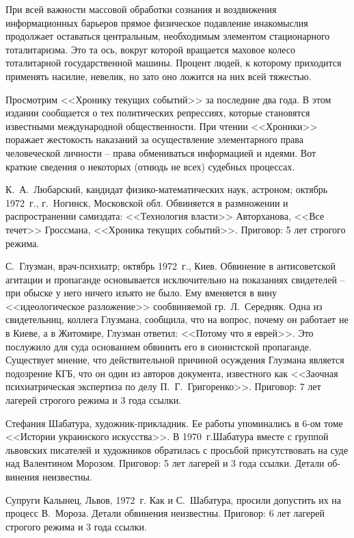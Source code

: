 \documentclass{book}
\begin{document}
При всей важности массовой обработки сознания и воздвижения информационных барьеров прямое физическое подавление инакомыслия 
продолжает оставаться центральным, необходимым элементом стационарного тоталитаризма. Это та ось, вокруг которой вращается 
маховое колесо тоталитарной государственной машины. Процент людей, к которому приходится применять насилие, невелик, но зато оно 
ложится на них всей тяжестью.

Просмотрим <<Хронику текущих событий>> за последние два года. В этом издании сообщается о тех политических репрессиях, которые 
становятся известными международной общественности. При чтении <<Хроники>> поражает жестокость наказаний за осуществление 
элементарного права человеческой личности -- права обмениваться информацией и идеями. Вот краткие сведения о некоторых (отнюдь 
не всех) судебных процессах.

К.~А.~Любарский, кандидат физико-математических наук, астроном; октябрь 1972~г., г.~Ногинск, Московской обл. Обвиняется в 
размножении и распространении самиздата: <<Технология власти>> Авторханова, <<Все течет>> Гроссмана, <<Хроника текущих событий>>. 
Приговор: 5 лет строгого режима.

С.~Глузман, врач-психиатр; октябрь 1972~г., Киев. Обвинение в антисоветской агитации и пропаганде основывается исклю­чительно на 
показаниях свидетелей -- при обыске у него ничего изъято не было. Ему вменяется в вину <<идеологическое разложение>> сообвиняемой 
гр.~Л.~Середняк. Одна из свидетельниц, коллега Глузмана, сообщила, что на вопрос, почему он работает не в Киеве, а в Житомире, 
Глузман ответил: <<Потому что я еврей>>. Это послужило для суда основанием обвинить его в сионистской пропаганде. Существует 
мнение, что действительной причиной осуждения Глузмана является подозрение КГБ, что он один из авторов документа, известного как 
<<Заочная психиатрическая экспертиза по делу П.~Г.~Григоренко>>. Приговор: 7 лет лагерей строгого режима и 3 года ссылки.

Стефания Шабатура, художник-прикладник. Ее работы упоминались в 6-ом томе <<Истории украинского искусства>>. В 1970~г.Шабатура 
вместе с группой львовских писателей и художников обратилась с просьбой присутствовать на суде над Валентином Морозом. Приговор: 
5 лет лагерей и 3 года ссылки. Детали об­винения неизвестны.

Супруги Калынец, Львов, 1972~г. Как и С.~Шабатура, просили допустить их на процесс В.~Мороза. Детали обвинения неиз­вестны. 
Приговор: 6 лет лагерей строгого режима и 3 года ссылки.
\end{document}
